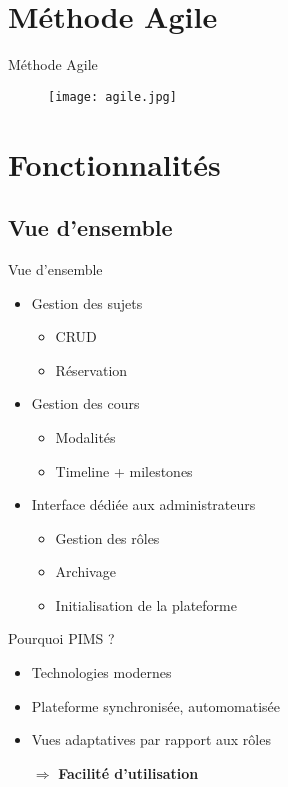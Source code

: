 \documentclass[numbering=fraction]{beamer}
\begin{document}
\section{Méthode Agile}
\begin{frame}{Méthode Agile}
    \begin{figure}
        \centering
        \texttt{[image: agile.jpg]}
        
    \end{figure}
\end{frame}

\section{Fonctionnalités}
\subsection{Vue d'ensemble}

\begin{frame}{Vue d'ensemble}
    \begin{itemize}
        \item Gestion des sujets
        \begin{itemize}
            \item CRUD
            \item Réservation
        \end{itemize} 
        \item Gestion des cours
        \begin{itemize}
            \item Modalités 
            \item Timeline + milestones
        \end{itemize}
        \item Interface dédiée aux administrateurs
        \begin{itemize}
            \item Gestion des rôles
            \item Archivage 
            \item Initialisation de la plateforme
        \end{itemize}
    \end{itemize}
\end{frame}


\begin{frame}{Pourquoi PIMS ?}
    \begin{itemize}
        \item Technologies modernes
        \item Plateforme synchronisée, automomatisée
        \item Vues adaptatives par rapport aux rôles
        \item[$\Longrightarrow$] \textbf{Facilité d'utilisation}
    \end{itemize}
\end{frame}
\end{document}
